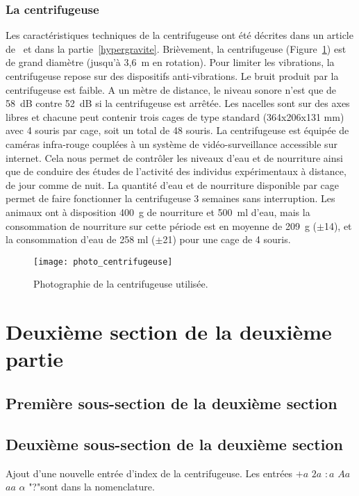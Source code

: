 \subsubsection{La centrifugeuse}
Les caractéristiques techniques de la centrifugeuse ont été décrites dans un article de~\cite{jamon_ground-based_2008} et dans la partie~\ref{hypergravite}. Brièvement, la centrifugeuse (Figure~\ref{photo_centrifugeuse}) est de grand diamètre (jusqu'à 3,6~m en rotation). Pour limiter les vibrations, la centrifugeuse repose sur des dispositifs anti-vibrations. Le bruit produit par la centrifugeuse est faible. A un mètre de distance, le niveau sonore n'est que de 58~dB contre 52~dB si la centrifugeuse est arrêtée. Les nacelles sont sur des axes libres et chacune peut contenir trois cages de type standard (364x206x131 mm) avec 4 souris par cage, soit un total de 48 souris. La centrifugeuse est équipée de caméras infra-rouge couplées à un système de vidéo-surveillance accessible sur internet. Cela nous permet de contrôler les niveaux d'eau et de nourriture ainsi que de conduire des études de l'activité des individus expérimentaux à distance, de jour comme de nuit. La quantité d'eau et de nourriture disponible par cage permet de faire fonctionner la centrifugeuse 3 semaines sans interruption. Les animaux ont à disposition 400~g de nourriture et 500~ml d'eau, mais la consommation de nourriture sur cette période est en moyenne de 209~g ($\pm$14), et la consommation d'eau de 258 ml ($\pm$21) pour une cage de 4 souris.
\begin{figure}[h!tbp]
\vspace{0.5cm}
\setcapindent{2em}
  \centering
  \texttt{[image: photo\_centrifugeuse]}
  \caption[Photographie de la centrifugeuse]{Photographie de la centrifugeuse utilisée.}
\label{photo_centrifugeuse}
\end{figure}
\lipsum[2]
\section{Deuxième section de la deuxième partie}
\lipsum[3]
\subsection{Première sous-section de la deuxième section}
\lipsum[4]
\subsection[Sous-sous section 2]{Deuxième sous-section de la deuxième section} %
Ajout d'une nouvelle entrée d'index de la centrifugeuse. Les entrées $+a$ $2a$ $:a$ $Aa$ $aa$ $\alpha$ {\NoAutoSpaceBeforeFDP "?"}sont dans la nomenclature.
